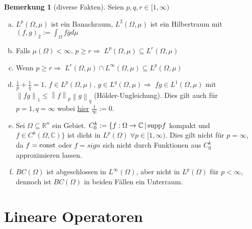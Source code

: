 \documentclass[ngerman]{report}
\theoremstyle{plain}%
\theoremstyle{definition}%
\theoremstyle{myStyle}
\newtheorem{bem}[thm]{Bemerkung}
\newcommand{\C}{\mathbb{C}}
\newcommand{\R}{\mathbb{R}}
\newcommand{\supp}{\textnormal{supp}}
\newcommand{\norm}[1]{\left \|#1\right\| }
\begin{document}
	\begin{bem}[diverse Fakten]
		Seien $p,q,r\in [1,\infty)$
		\begin{enumerate}[(a)]
			\item $L^p(\Omega,\mu)$ ist ein Banachraum, $L^2(\Omega,\mu)$ ist ein Hilbertraum mit $(f,g)_2 := \int_\Omega f \overline{g} d\mu$
			
			\item Falls $\mu(\Omega) < \infty,\, p\geq r \Rightarrow\; L^p(\Omega,\mu)\subseteq L^r(\Omega,\mu)$
			
			\item Wenn $p\geq r\Rightarrow\; L^r(\Omega,\mu)\cap L^\infty(\Omega,\mu)\subseteq L^p(\Omega,\mu)$
			
			\item $\frac{1}{p}+\frac{1}{q}=1,\,f\in L^p(\Omega,\mu),\,g\in L^q(\Omega,\mu)\Rightarrow\;fg\in 		 L^1(\Omega,\mu)$ mit $\norm{fg}_1\leq\norm{f}_p\norm{g}_q$ (Hölder-Ungleichung). Dies gilt auch für $p=1, q=\infty$ wobei \underline{hier} $\frac{1}{\infty}:=0$.
			
			\item Sei $\Omega\subseteq \R^n$ ein Gebiet. $C^k_0:=\{f:\Omega \rightarrow \C\,|\, \supp f$ kompakt und $f\in C^k(\Omega,\C)\}$ ist dicht in $L^p(\Omega)\;\forall p\in[1,\infty)$. Dies gilt nicht für $p=\infty$, da $f=\textnormal{const}$ oder $f=sign$ sich nicht durch Funktionen aus $C^k_0$ approximieren lassen.
			
			\item $BC(\Omega)$ ist abgeschlossen in $L^\infty (\Omega)$, aber nicht in $L^p(\Omega)$ für $p<\infty$, dennoch ist $BC(\Omega)$ in beiden Fällen ein Unterraum.
		\end{enumerate}
	\end{bem}



\section{Lineare Operatoren}
\end{document}
